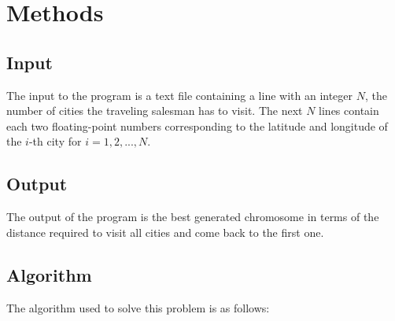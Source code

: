 \documentclass[twoside,twocolumn]{article}
\begin{document}
  
  \section{Methods}
  
  \subsection{Input}
  The input to the program is a text file containing a line with an integer $N$, the number of cities the traveling salesman has to visit. The next $N$ lines contain each two floating-point numbers corresponding to the latitude and longitude of the $i$-th city for $i = 1,2,...,N$.
  
  \subsection{Output}
  The output of the program is the best generated chromosome in terms of the distance required to visit all cities and come back to the first one.
  
  \subsection{Algorithm} 
  The algorithm used to solve this problem is as follows:
  
\end{document}
